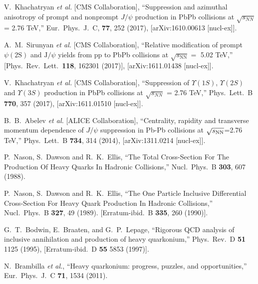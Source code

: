 \documentclass[12pt,a4paper,final]{iopart}
\begin{document}
\begin{thebibliography}{100}
  V.~Khachatryan {\it et al.} [CMS Collaboration],
  ``Suppression and azimuthal anisotropy of prompt and nonprompt $J/\psi$ production in PbPb collisions at $\sqrt{s_{NN}}$ = 2.76 TeV,''
  Eur.\ Phys.\ J.\ C, {\bf 77}, 252 (2017), [arXiv:1610.00613 [nucl-ex]].



  A.~M.~Sirunyan {\it et al.} [CMS Collaboration],
  ``Relative modification of prompt $ {\psi\mathrm{(2S)}} $ and $\mathrm{J}/\psi $ yields from pp to PbPb collisions at ${\sqrt{s_{\mathrm{NN}}}} = $ 5.02 TeV,''
  [Phys.\ Rev.\ Lett.\  {\bf 118}, 162301 (2017)], [arXiv:1611.01438 [nucl-ex]].


  V.~Khachatryan {\it et al.} [CMS Collaboration],
  ``Suppression of $\Upsilon(1S)$, $\Upsilon(2S)$ and $\Upsilon(3S)$ production in PbPb collisions at $\sqrt{s_{NN}}$ = 2.76 TeV,''
  Phys.\ Lett.\ B {\bf 770}, 357 (2017), [arXiv:1611.01510 [nucl-ex]].

  B.~B.~Abelev {\it et al.} [ALICE Collaboration],
  ``Centrality, rapidity and transverse momentum dependence of $J/\psi$ suppression in Pb-Pb collisions at $\sqrt{s_{\rm NN}}$=2.76 TeV,''
  Phys.\ Lett.\ B {\bf 734}, 314 (2014), [arXiv:1311.0214 [nucl-ex]].




  P.~Nason, S.~Dawson and R.~K.~Ellis,
  ``The Total Cross-Section For The Production Of Heavy Quarks In Hadronic Collisions,''
  Nucl.\ Phys.\ B {\bf 303}, 607 (1988).
  
  P.~Nason, S.~Dawson and R.~K.~Ellis,
  ``The One Particle Inclusive Differential Cross-Section For Heavy Quark Production In Hadronic Collisions,''
  Nucl.\ Phys.\ B {\bf 327}, 49 (1989).
  [Erratum-ibid.\ B {\bf 335}, 260 (1990)].

G.~T.~Bodwin, E.~Braaten, and G.~P.~Lepage,
``Rigorous QCD analysis of inclusive annihilation and production of heavy
quarkonium,''
Phys.\ Rev.\ D {\bf 51} 1125 (1995), 
[Erratum-ibid.\ D {\bf 55} 5853 (1997)].



  N.~Brambilla {\it et al.},
  ``Heavy quarkonium: progress, puzzles, and opportunities,''
  Eur.\ Phys.\ J.\ C {\bf 71}, 1534 (2011).



\end{thebibliography}
\end{document}
